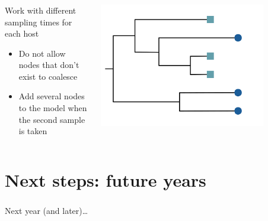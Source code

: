 \documentclass[aspectratio=169]{beamer}
\begin{document}
\begin{frame} \frametitle{\insertsection}

    \begin{columns}

        \begin{column}{0.5\textwidth}

            Work with different sampling times for each host

            \begin{itemize}
                \item{Do not allow nodes that don't exist to coalesce}
                \item{Add several nodes to the model when the second sample is taken}
            \end{itemize}
            
        \end{column}

        \begin{column}{0.5\textwidth}

            \centering\includegraphics[width=0.8\textwidth]{images/tree-blank-multisample}

        \end{column}

    \end{columns}

\end{frame}

\section{Next steps: future years}

\begin{frame} \frametitle{\insertsection}

    Next year (and later)\ldots

\end{frame}
\end{document}
